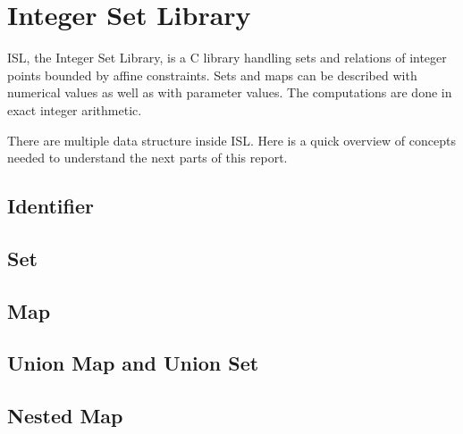 \chapter{Integer Set Library}\label{ch:ISL}

ISL, the Integer Set Library, is a C library handling sets and relations of integer points bounded by affine constraints. Sets and maps can be described with numerical values as well as with parameter values. The computations are done in exact integer arithmetic. 

There are multiple data structure inside ISL. Here is a quick overview of concepts needed to understand the next parts of this report. 

\section{Identifier}

\section{Set}

\section{Map}

\section{Union Map and Union Set}

\section{Nested Map}